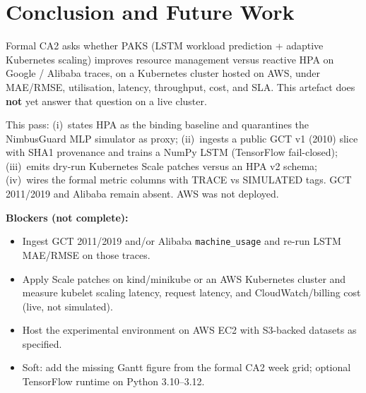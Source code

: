 
\section{Conclusion and Future Work}
\label{sec:Conclusion}

Formal CA2 asks whether PAKS (LSTM workload prediction + adaptive Kubernetes scaling) improves resource management versus reactive HPA on Google / Alibaba traces, on a Kubernetes cluster hosted on AWS, under MAE/RMSE, utilisation, latency, throughput, cost, and SLA. This artefact does \textbf{not} yet answer that question on a live cluster.

This pass: (i)~states HPA as the binding baseline and quarantines the NimbusGuard MLP simulator as proxy; (ii)~ingests a public GCT v1 (2010) slice with SHA1 provenance and trains a NumPy LSTM (TensorFlow fail-closed); (iii)~emits dry-run Kubernetes Scale patches versus an HPA v2 schema; (iv)~wires the formal metric columns with TRACE vs SIMULATED tags. GCT 2011/2019 and Alibaba remain absent. AWS was not deployed.

\textbf{Blockers (not complete):}
\begin{itemize}
  \item Ingest GCT 2011/2019 and/or Alibaba \texttt{machine\_usage} and re-run LSTM MAE/RMSE on those traces.
  \item Apply Scale patches on kind/minikube or an AWS Kubernetes cluster and measure kubelet scaling latency, request latency, and CloudWatch/billing cost (live, not simulated).
  \item Host the experimental environment on AWS EC2 with S3-backed datasets as specified.
  \item Soft: add the missing Gantt figure from the formal CA2 week grid; optional TensorFlow runtime on Python 3.10--3.12.
\end{itemize}
